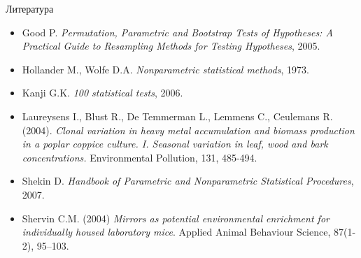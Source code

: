 \documentclass[11pt,pdf,utf8,hyperref={unicode},aspectratio=169]{beamer}
\begin{document}
\begin{frame}[allowframebreaks]{Литература}
\begin{itemize}
\item Good P. \textit{Permutation, Parametric and Bootstrap Tests of Hypotheses: A Practical Guide to Resampling Methods for Testing Hypotheses}, 2005.
\item Hollander M., Wolfe D.A. \textit{Nonparametric statistical methods}, 1973.
\item Kanji G.K. \textit{100 statistical tests}, 2006.
\item Laureysens I., Blust R., De Temmerman L., Lemmens C., Ceulemans R. (2004). \textit{Clonal variation in heavy metal accumulation and biomass production in a poplar coppice culture. I. Seasonal variation in leaf, wood and bark concentrations.} Environmental Pollution, 131, 485-494.
\item Shekin D. \textit{Handbook of Parametric and Nonparametric Statistical Procedures}, 2007.
\item Shervin C.M. (2004) \textit{Mirrors as potential environmental enrichment for individually housed laboratory mice}. Applied Animal Behaviour Science, 87(1-2), 95--103.

\end{itemize}
\end{frame}
\end{document}
